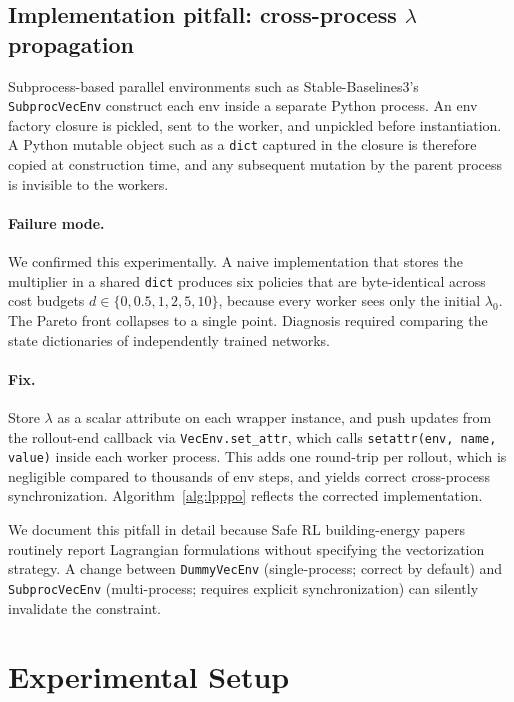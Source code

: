 \subsection{Implementation pitfall: cross-process $\lambda$ propagation}\label{sec:pitfall}

Subprocess-based parallel environments such as Stable-Baselines3's
\texttt{SubprocVecEnv} construct each env inside a separate Python
process. An env factory closure is pickled, sent to the worker, and
unpickled before instantiation. A Python mutable object such as a
\texttt{dict} captured in the closure is therefore copied at
construction time, and any subsequent mutation by the parent process
is invisible to the workers.

\paragraph{Failure mode.}
We confirmed this experimentally. A naive implementation that stores
the multiplier in a shared \texttt{dict} produces six policies that
are byte-identical across cost budgets $d\in\{0,0.5,1,2,5,10\}$,
because every worker sees only the initial $\lambda_0$. The Pareto
front collapses to a single point. Diagnosis required comparing the
state dictionaries of independently trained networks.

\paragraph{Fix.}
Store $\lambda$ as a scalar attribute on each wrapper instance, and
push updates from the rollout-end callback via
\texttt{VecEnv.set\_attr}, which calls
\texttt{setattr(env, name, value)} inside each worker process. This
adds one round-trip per rollout, which is negligible compared to
thousands of env steps, and yields correct cross-process
synchronization. Algorithm~\ref{alg:lpppo} reflects the corrected
implementation.

We document this pitfall in detail because Safe RL building-energy
papers routinely report Lagrangian formulations without specifying the
vectorization strategy. A change between \texttt{DummyVecEnv}
(single-process; correct by default) and \texttt{SubprocVecEnv}
(multi-process; requires explicit synchronization) can silently
invalidate the constraint.

\section{Experimental Setup}\label{sec:setup}

